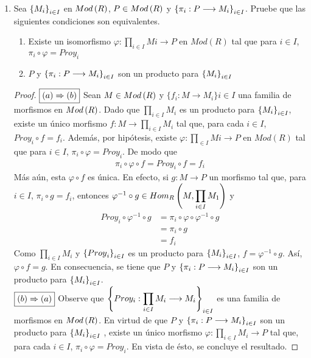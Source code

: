 \documentclass{article}
\begin{document}
\begin{enumerate}[label=\textbf{Ej \arabic*.}]
		\item Sea ${\left\{{M}_{i}\right\}}_{i\in I}$ en $Mod\left(R\right)$, $P \in Mod\left(R\right)$ y $\left\{\pi_{i}: P \longrightarrow M_{i}\right\}_{i \in I}$. Pruebe que las siguientes condiciones son equivalentes.
		\begin{enumerate}
			\item Existe un isomorfismo $\varphi : \displaystyle\prod_{i \in I} Mi \longrightarrow P$ en $Mod(R)$ tal que para $i \in I$, $\pi_{i}\circ\varphi = Proy_{i}$
			\item $P$ y $\left\{\pi_{i}: P \longrightarrow M_{i}\right\}_{i \in I}$ son un producto para ${\left\{{M}_{i}\right\}}_{i\in I}$
		\end{enumerate}
		\begin{proof}
			$\boxed{\left(a\right)\Rightarrow\left(b\right)}$ Sean $M \in Mod\left(R\right)$ y $\{f_{i}:M \longrightarrow M_{i}\}{i \in I}$ una familia de morfismos en $Mod\left(R\right)$. Dado que $\displaystyle\prod_{i \in I}M_{i}$ es un producto para ${\left\{{M}_{i}\right\}}_{i\in I}$, existe un único morfismo $f:M\longrightarrow\displaystyle\prod_{i \in I}M_{i}$ tal que, para cada $i \in I$, $Proy_{i} \circ f = f_{i}$. Además, por hipótesis, existe $\varphi : \displaystyle\prod_{\in I} Mi \longrightarrow P$ en $Mod(R)$ tal que para $i \in I$, $\pi_{i}\circ\varphi = Proy_{i}$. De modo que 
			\begin{align*}
				\pi_{i}\circ\varphi\circ f = Proy_{i} \circ f = f_{i}
			\end{align*}
			Más aún, esta $\varphi \circ f$ es única. En efecto, si $g:M \longrightarrow P$ un morfismo tal que, para $i \in I$, $\pi_{i}\circ g = f_{i}$, entonces $\varphi^{-1}\circ g \in Hom_{R}\left(M,\displaystyle\prod_{i \in I}M_{1}\right)$ y
			\begin{align*}
				Proy_{i}\circ\varphi^{-1}\circ g &= \pi_{i}\circ\varphi\circ\varphi^{-1}\circ g\\
				&= \pi_{i}\circ g\\
				&= f_{i}
			\end{align*}
			Como $\displaystyle\prod_{i \in I}M_{i}$ y ${\left\{{Proy}_{i}\right\}}_{i\in I}$ es un producto para ${\left\{{M}_{i}\right\}}_{i\in I}$, $f=\varphi^{-1}\circ g$. Así, $\varphi\circ f=g$. En consecuencia, se tiene que $P$ y $\left\{\pi_{i}: P \longrightarrow M_{i}\right\}_{i \in I}$ son un producto para ${\left\{{M}_{i}\right\}}_{i\in I}$.\\
			
			$\boxed{\left(b\right)\Rightarrow\left(a\right)}$ Observe que $\left\{Proy_{i}:\displaystyle\prod_{i \in I} M_{i} \longrightarrow M_{i}\right\}_{i \in I}$ es una familia de morfismos en $Mod\left(R\right)$. En virtud de que $P$ y $\left\{\pi_{i}:P \longrightarrow M_{i}\right\}_{i \in I}$ son un producto para ${\left\{{M}_{i}\right\}}_{i\in I}$ , existe un único morfismo $\varphi:\displaystyle\prod_{i \in I} M_{i} \longrightarrow P$ tal que, para cada $i \in I$, $\pi_{i}\circ\varphi = Proy_{i}$. En vista de ésto, se concluye el resultado.
		\end{proof}
		

\end{enumerate}
\end{document}
